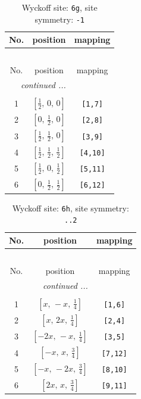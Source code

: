 \documentclass[fleqn,8pt]{jsarticle}
\begin{document}
\renewcommand{\arraystretch}{1.2}
\begin{longtable}{ccc}
\caption{Wyckoff site: {\tt 6g}, site symmetry: {\tt -1}}
 \\
 \hline \hline
No. & position & mapping \\ \hline \endfirsthead

\multicolumn{2}{l}{\tablename\ \thetable{}} \\
 \hline \hline
No. & position & mapping \\ \hline \endhead

 \hline \hline
\multicolumn{2}{r}{\footnotesize\it continued ...} \\ \endfoot

 \hline \hline
\multicolumn{2}{r}{} \\ \endlastfoot

1 & $\left[ \frac{1}{2},\, 0,\, 0 \right]$ & {\tt [1,7]} \\ \hline
2 & $\left[ 0,\, \frac{1}{2},\, 0 \right]$ & {\tt [2,8]} \\ \hline
3 & $\left[ \frac{1}{2},\, \frac{1}{2},\, 0 \right]$ & {\tt [3,9]} \\ \hline
4 & $\left[ \frac{1}{2},\, \frac{1}{2},\, \frac{1}{2} \right]$ & {\tt [4,10]} \\ \hline
5 & $\left[ \frac{1}{2},\, 0,\, \frac{1}{2} \right]$ & {\tt [5,11]} \\ \hline
6 & $\left[ 0,\, \frac{1}{2},\, \frac{1}{2} \right]$ & {\tt [6,12]} \\
\end{longtable}
\renewcommand{\arraystretch}{1.2}
\begin{longtable}{ccc}
\caption{Wyckoff site: {\tt 6h}, site symmetry: {\tt ..2}}
 \\
 \hline \hline
No. & position & mapping \\ \hline \endfirsthead

\multicolumn{2}{l}{\tablename\ \thetable{}} \\
 \hline \hline
No. & position & mapping \\ \hline \endhead

 \hline \hline
\multicolumn{2}{r}{\footnotesize\it continued ...} \\ \endfoot

 \hline \hline
\multicolumn{2}{r}{} \\ \endlastfoot

1 & $\left[ x,\, - x,\, \frac{1}{4} \right]$ & {\tt [1,6]} \\ \hline
2 & $\left[ x,\, 2 x,\, \frac{1}{4} \right]$ & {\tt [2,4]} \\ \hline
3 & $\left[ - 2 x,\, - x,\, \frac{1}{4} \right]$ & {\tt [3,5]} \\ \hline
4 & $\left[ - x,\, x,\, \frac{3}{4} \right]$ & {\tt [7,12]} \\ \hline
5 & $\left[ - x,\, - 2 x,\, \frac{3}{4} \right]$ & {\tt [8,10]} \\ \hline
6 & $\left[ 2 x,\, x,\, \frac{3}{4} \right]$ & {\tt [9,11]} \\
\end{longtable}
\end{document}
